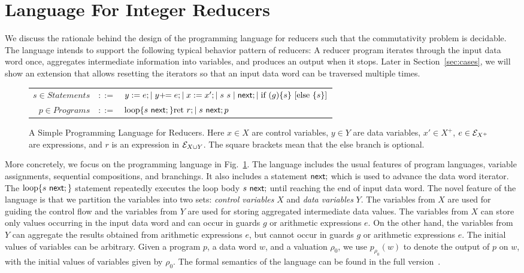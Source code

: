  
\section{Language For Integer Reducers}\label{sec-mr-prog}
\label{sec:language}
We discuss the rationale behind the design of the programming language for reducers such that the commutativity problem is decidable. The language intends to support the following typical behavior pattern of reducers: A reducer program iterates through the input data word once, aggregates intermediate information into variables, and produces an output when it stops. 
%
Later in Section~\ref{sec:cases}, we will show an extension that allows resetting the iterators so that an input data word can be traversed multiple times.

\begin{figure}

	\centering
	\begin{tabular}{rcl}
        $ s \in Statements$&$::=$&$y := e;\mid y +\!\!= e; \mid x:=x';\mid s\ s\mid \mathsf{next}; \mid \mbox{if } (g) \{s\} \mbox{ [else } \{s\}\mbox{]}$\\
		$ p\in Programs$&$::=$&$\loopL{s\ \nnext;}\mbox{ret }r; \mid s\ \nnext;p$		
	\end{tabular}
	\caption{A Simple Programming Language for Reducers. Here $x\in X$ are control variables, $y\in Y$ are data variables, $x' \in X^+$, $e\in {\mathcal{E} }_{X^+}$ are expressions, and $r$ is an expression in ${\mathcal{E} }_{X \cup Y}$. The square brackets mean that the else branch is optional. }
	\label{fig:language}
		\vspace{-0.5cm}
\end{figure}

More concretely, we focus on the programming language in Fig.~\ref{fig:language}. The language includes the usual features of program languages, variable assignments, sequential compositions, and branchings. It also includes a statement $\mathsf{next};$ which is used to advance the data word iterator. The $\mbox{loop\{} s\ \mathsf{next};\mbox{\}}$ statement repeatedly executes the loop body $s\ \mathsf{next};$ until reaching the end of input data word.
The novel feature of the language is that we partition the variables into two sets: \emph{control variables} $X$ and \emph{data variables} $Y$.
The variables from $X$ are used for guiding the control flow and the variables from $Y$ are used for storing aggregated intermediate data values.
The variables from $X$ can store only values occurring in the input data word and can occur in guards $g$ or arithmetic expressions $e$.
On the other hand, the variables from $Y$ can aggregate the results obtained from arithmetic expressions $e$, but cannot occur in guards $g$ or arithmetic expressions $e$. The initial values of variables can be arbitrary.
Given a program $p$, a data word $w$, and a valuation $\rho_0$, we use $p_{\rho_0}(w)$ to denote the output of $p$ on $w$, with the initial values of variables given by $\rho_0$. The formal semantics of the language can be found in the full version~\cite{full-version}. 

